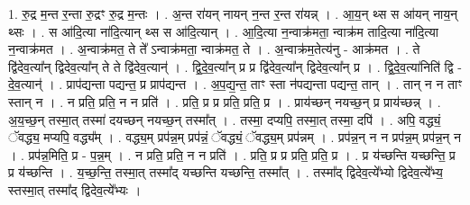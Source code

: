 \documentclass[17pt]{extarticle}
\begin{document}
1. रु॒द्र म॒न्त र॒न्ता रु॒द्रꣳ रु॒द्र म॒न्तः । . अ॒न्त रा॑यन् नायन् न॒न्त र॒न्त रा॑यन्न् । . आ॒य॒न् थ्स स आ॑यन् नाय॒न् थ्सः । . स आ॑दि॒त्या ना॑दि॒त्यान् थ्स स आ॑दि॒त्यान् । . आ॒दि॒त्या न॒न्वाक्र॑मता॒ न्वाक्र॑म तादि॒त्या ना॑दि॒त्या न॒न्वाक्र॑मत । . अ॒न्वाक्र॑मत॒ ते ते᳚ ऽन्वाक्र॑मता॒ न्वाक्र॑मत॒ ते । . अ॒न्वाक्र॑म॒तेत्य॑नु - आक्र॑मत । . ते द्वि॑देव॒त्या᳚न् द्विदेव॒त्या᳚न् ते ते द्वि॑देव॒त्यान्॑ । . द्वि॒दे॒व॒त्या᳚न् प्र प्र द्वि॑देव॒त्या᳚न् द्विदेव॒त्या᳚न् प्र । . द्वि॒दे॒व॒त्या॑निति॑ द्वि - दे॒व॒त्यान्॑ । . प्राप॑द्यन्ता पद्यन्त॒ प्र प्राप॑द्यन्त । . अ॒प॒द्य॒न्त॒ ताꣳ स्ता न॑पद्यन्ता पद्यन्त॒ तान् । . तान् न न ताꣳ स्तान् न । . न प्रति॒ प्रति॒ न न प्रति॑ । . प्रति॒ प्र प्र प्रति॒ प्रति॒ प्र । . प्राय॑च्छन् नयच्छ॒न् प्र प्राय॑च्छन्न् । . अ॒य॒च्छ॒न् तस्मा॒त् तस्मा॑ दयच्छन् नयच्छ॒न् तस्मा᳚त् । . तस्मा॒ दप्यपि॒ तस्मा॒त् तस्मा॒ दपि॑ । . अपि॒ वद्ध्यं॒ ॅवद्ध्य॒ मप्यपि॒ वद्ध्य᳚म् । . वद्ध्य॒म् प्रप॑न्न॒म् प्रप॑न्नं॒ ॅवद्ध्यं॒ ॅवद्ध्य॒म् प्रप॑न्नम् । . प्रप॑न्न॒न् न न प्रप॑न्न॒म् प्रप॑न्न॒न् न । . प्रप॑न्न॒मिति॒ प्र - प॒न्न॒म् । . न प्रति॒ प्रति॒ न न प्रति॑ । . प्रति॒ प्र प्र प्रति॒ प्रति॒ प्र । . प्र य॑च्छन्ति यच्छन्ति॒ प्र प्र य॑च्छन्ति । . य॒च्छ॒न्ति॒ तस्मा॒त् तस्मा᳚द् यच्छन्ति यच्छन्ति॒ तस्मा᳚त् । . तस्मा᳚द् द्विदेव॒त्ये᳚भ्यो द्विदेव॒त्ये᳚भ्य॒ स्तस्मा॒त् तस्मा᳚द् द्विदेव॒त्ये᳚भ्यः । \newline
\end{document}
